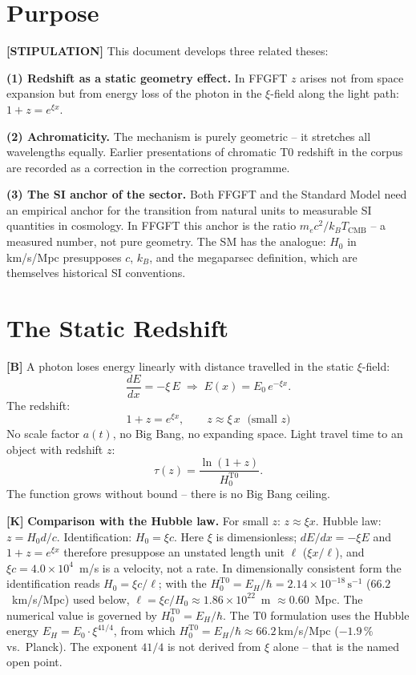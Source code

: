 \section{Purpose}

\textbf{[STIPULATION]} This document develops three related theses:

\textbf{(1) Redshift as a static geometry effect.} In FFGFT $z$ arises not from
space expansion but from energy loss of the photon in the $\xi$-field along the
light path: $1+z=e^{\xi x}$.

\textbf{(2) Achromaticity.} The mechanism is purely geometric -- it stretches all
wavelengths equally. Earlier presentations of chromatic T0 redshift in the corpus
are recorded as a correction in the correction programme.

\textbf{(3) The SI anchor of the sector.} Both FFGFT and the Standard Model need
an empirical anchor for the transition from natural units to measurable SI
quantities in cosmology. In FFGFT this anchor is the ratio $m_ec^2/k_BT_\text{CMB}$
-- a measured number, not pure geometry. The SM has the analogue: $H_0$ in km/s/Mpc
presupposes $c$, $k_B$, and the megaparsec definition, which are themselves
historical SI conventions.

\section{The Static Redshift}

\textbf{[B]} A photon loses energy linearly with distance travelled in the static
$\xi$-field:
\[
  \frac{dE}{dx} = -\xi\,E
  \;\Rightarrow\;
  E(x) = E_0\,e^{-\xi x}.
\]
The redshift:
\[
  \boxed{\;1+z = e^{\xi x},\qquad z\approx\xi\,x\;\text{ (small }z\text{)}\;}
\]
No scale factor $a(t)$, no Big Bang, no expanding space. Light travel time to an
object with redshift $z$:
\[
  \tau(z) = \frac{\ln(1+z)}{H_0^\text{T0}}.
\]
The function grows without bound -- there is no Big Bang ceiling.

\textbf{[K]} \textbf{Comparison with the Hubble law.} For small $z$: $z\approx\xi x$.
Hubble law: $z=H_0 d/c$. Identification: $H_0=\xi c$. Here $\xi$ is dimensionless; $dE/dx=-\xi E$ and $1+z=e^{\xi x}$ therefore presuppose an unstated length unit $\ell$ ($\xi x/\ell$), and $\xi c = 4{.}0\times10^{4}$~m/s is a velocity, not a rate. In dimensionally consistent form the identification reads $H_0=\xi c/\ell$; with the $H_0^\text{T0}=E_H/\hbar = 2{.}14\times10^{-18}\,\text{s}^{-1}$ ($66{.}2$~km/s/Mpc) used below, $\ell = \xi c/H_0 \approx 1{.}86\times10^{22}$~m $\approx 0{.}60$~Mpc. The numerical value is governed by $H_0^\text{T0}=E_H/\hbar$. The T0 formulation uses
the Hubble energy $E_H=E_0\cdot\xi^{41/4}$, from which
$H_0^\text{T0}=E_H/\hbar\approx66{.}2\,$km/s/Mpc ($-1{.}9\,\%$ vs.\ Planck).
The exponent $41/4$ is not derived from $\xi$ alone -- that is the named open
point.

